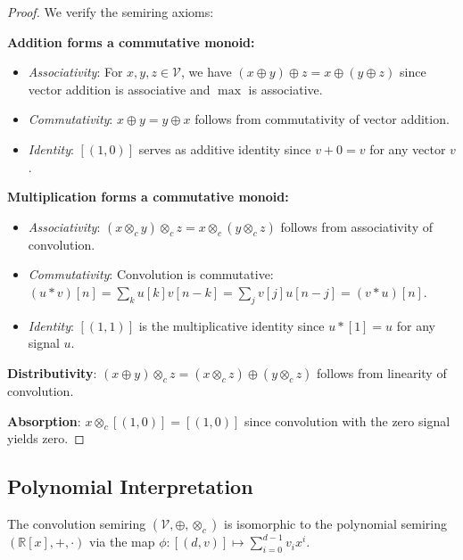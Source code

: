 \documentclass[sigconf,review]{acmart}
\begin{document}
\begin{proof}
We verify the semiring axioms:

\textbf{Addition forms a commutative monoid:}
\begin{itemize}
\item \emph{Associativity}: For $x,y,z \in \mathcal{V}$, we have $(x \oplus y) \oplus z = x \oplus (y \oplus z)$ since vector addition is associative and $\max$ is associative.
\item \emph{Commutativity}: $x \oplus y = y \oplus x$ follows from commutativity of vector addition.
\item \emph{Identity}: $[(1,0)]$ serves as additive identity since $v + 0 = v$ for any vector $v$.
\end{itemize}

\textbf{Multiplication forms a commutative monoid:}
\begin{itemize}
\item \emph{Associativity}: $(x \otimes_c y) \otimes_c z = x \otimes_c (y \otimes_c z)$ follows from associativity of convolution.
\item \emph{Commutativity}: Convolution is commutative: $(u * v)[n] = \sum_{k} u[k]v[n-k] = \sum_{j} v[j]u[n-j] = (v * u)[n]$.
\item \emph{Identity}: $[(1,1)]$ is the multiplicative identity since $u * [1] = u$ for any signal $u$.
\end{itemize}

\textbf{Distributivity}: $(x \oplus y) \otimes_c z = (x \otimes_c z) \oplus (y \otimes_c z)$ follows from linearity of convolution.

\textbf{Absorption}: $x \otimes_c [(1,0)] = [(1,0)]$ since convolution with the zero signal yields zero.
\end{proof}

\subsection{Polynomial Interpretation}

\begin{theorem}
\label{thm:polynomial-iso}
The convolution semiring $(\mathcal{V}, \oplus, \otimes_c)$ is isomorphic to the polynomial semiring $(\mathbb{R}[x], +, \cdot)$ via the map $\phi: [(d,v)] \mapsto \sum_{i=0}^{d-1} v_i x^i$.
\end{theorem}
\end{document}
